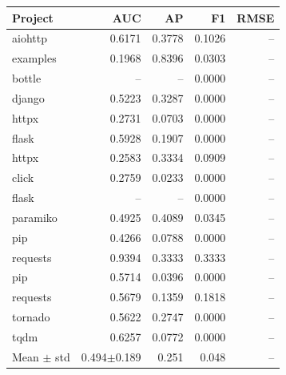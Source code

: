 \begin{tabular}{lrrrr}
\toprule
Project & AUC & AP & F1 & RMSE \\
\midrule
aiohttp & 0.6171 & 0.3778 & 0.1026 & -- \\
examples & 0.1968 & 0.8396 & 0.0303 & -- \\
bottle & -- & -- & 0.0000 & -- \\
django & 0.5223 & 0.3287 & 0.0000 & -- \\
httpx & 0.2731 & 0.0703 & 0.0000 & -- \\
flask & 0.5928 & 0.1907 & 0.0000 & -- \\
httpx & 0.2583 & 0.3334 & 0.0909 & -- \\
click & 0.2759 & 0.0233 & 0.0000 & -- \\
flask & -- & -- & 0.0000 & -- \\
paramiko & 0.4925 & 0.4089 & 0.0345 & -- \\
pip & 0.4266 & 0.0788 & 0.0000 & -- \\
requests & 0.9394 & 0.3333 & 0.3333 & -- \\
pip & 0.5714 & 0.0396 & 0.0000 & -- \\
requests & 0.5679 & 0.1359 & 0.1818 & -- \\
tornado & 0.5622 & 0.2747 & 0.0000 & -- \\
tqdm & 0.6257 & 0.0772 & 0.0000 & -- \\
\midrule
Mean $\pm$ std & 0.494$\pm$0.189 & 0.251 & 0.048 & -- \\
\bottomrule
\end{tabular}